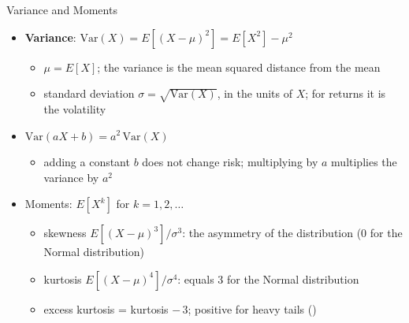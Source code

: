 \begin{frame}{Variance and Moments}
\itemsize{\small}
\begin{itemize}
    \item \textbf{Variance}: $\text{Var}(X) = E[(X - \mu)^2] = E[X^2] - \mu^2$
    \begin{itemize}
        \item $\mu = E[X]$; the variance is the mean squared distance from the mean
        \item standard deviation $\sigma = \sqrt{\text{Var}(X)}$, in the units of $X$; for returns it is the volatility
    \end{itemize}
    \item $\text{Var}(aX + b) = a^2\,\text{Var}(X)$
    \begin{itemize}
        \item adding a constant $b$ does not change risk; multiplying by $a$ multiplies the variance by $a^2$
    \end{itemize}
    \item Moments: $E[X^k]$ for $k = 1, 2, \dots$
    \begin{itemize}
        \item skewness $E[(X - \mu)^3]/\sigma^3$: the asymmetry of the distribution (0 for the Normal distribution)
        \item kurtosis $E[(X - \mu)^4]/\sigma^4$: equals 3 for the Normal distribution
        \item excess kurtosis = kurtosis $-\,3$; positive for heavy tails ()
    \end{itemize}
\end{itemize}
\end{frame}

